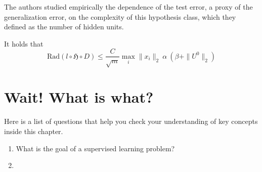 	The authors studied empirically the dependence of the test error, a proxy of
	the generalization error, on the complexity of this hypothesis class, which
	they defined as the number of hidden units. 

	It holds that
	$$
	\text{Rad}(l \circ \mathfrak{H} \circ D) \leq \frac{C}{\sqrt{m}} \max_i \|x_i\|_2 \ \alpha \ (\beta+ \|U^0\|_2)
	$$

\section*{Wait! What is what?}
Here is a list of questions that help you check your understanding of key
concepts inside this chapter.

\begin{enumerate}
    \item What is the goal of a supervised learning problem? 
    \item  
\end{enumerate}

